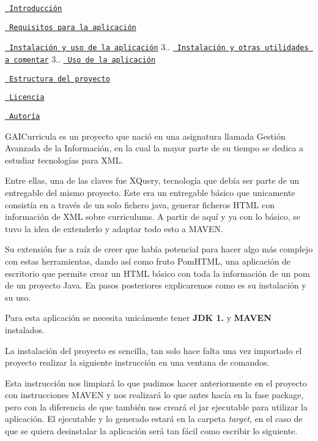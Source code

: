 
\begin{DoxyEnumerate}
\item \href{\#1-introducción}{\texttt{ Introducción}}
\item \href{\#2-requisitos-para-la-aplicación}{\texttt{ Requisitos para la aplicación}}
\item \href{\#3-instalación-y-uso-de-la-aplicación}{\texttt{ Instalación y uso de la aplicación}} 3.. \href{\#instalación-y-otras-utilidades-a-comentar}{\texttt{ Instalación y otras utilidades a comentar}} 3.. \href{\#uso-de-la-aplicación}{\texttt{ Uso de la aplicación}}
\item \href{\#4-estructura-del-proyecto}{\texttt{ Estructura del proyecto}}
\item \href{\#5-licencia}{\texttt{ Licencia}}
\item \href{\#6-autoría}{\texttt{ Autoría}}
\end{DoxyEnumerate}

G\+A\+I\+Curricula es un proyecto que nació en una asignatura llamada Gestión Avanzada de la Información, en la cual la mayor parte de su tiempo se dedica a estudiar tecnologías para X\+ML.

Entre ellas, una de las claves fue X\+Query, tecnología que debía ser parte de un entregable del mismo proyecto. Este era un entregable básico que unicamente consistía en a través de un solo fichero java, generar ficheros H\+T\+ML con información de X\+ML sobre curriculums. A partir de aquí y ya con lo básico, se tuvo la idea de extenderlo y adaptar todo esto a M\+A\+V\+EN.

Su extensión fue a raíz de creer que había potencial para hacer algo más complejo con estas herramientas, dando así como fruto Pom\+H\+T\+ML, una aplicación de escritorio que permite crear un H\+T\+ML básico con toda la información de un pom de un proyecto Java. En pasos posteriores explicaremos como es su instalación y su uso.

Para esta aplicación se necesita unicámente tener {\bfseries{J\+DK 1.}} y {\bfseries{M\+A\+V\+EN}} instalados.

La instalación del proyecto es sencilla, tan solo hace falta una vez importado el proyecto realizar la siguiente instrucción en una ventana de comandos. 
\begin{DoxyCode}{0}
\end{DoxyCode}
 Esta instrucción nos limpiará lo que pudimos hacer anteriormente en el proyecto con instrucciones M\+A\+V\+EN y nos realizará lo que antes hacía en la fase package, pero con la diferencia de que también nos creará el jar ejecutable para utilizar la aplicación. El ejecutable y lo generado estará en la carpeta {\itshape target}, en el caso de que se quiera desinstalar la aplicación será tan fácil como escribir lo siguiente. 
\begin{DoxyCode}{0}
\end{DoxyCode}


